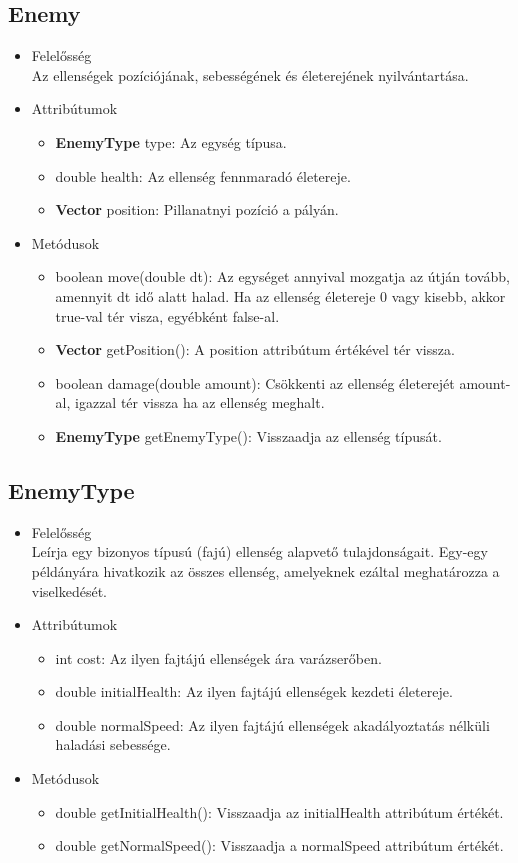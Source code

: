 \subsection{Enemy}
\begin{itemize}
\item Felelősség\\
Az ellenségek pozíciójának, sebességének és életerejének nyilvántartása.
\item Attribútumok
	\begin{itemize}
		\item \textbf{EnemyType} type: Az egység típusa.
		\item double health: Az ellenség fennmaradó életereje.
		\item \textbf{Vector} position: Pillanatnyi pozíció a pályán.
	\end{itemize}
\item Metódusok
	\begin{itemize}
		\item boolean move(double dt): Az egységet annyival mozgatja az útján tovább, amennyit dt idő alatt halad. Ha az ellenség életereje 0 vagy kisebb, akkor true-val tér visza, egyébként false-al.
		\item \textbf{Vector} getPosition(): A position attribútum értékével tér vissza.
		\item boolean damage(double amount): Csökkenti az ellenség életerejét amount-al, igazzal tér vissza ha az ellenség meghalt.
		\item \textbf{EnemyType} getEnemyType(): Visszaadja az ellenség típusát.
	\end{itemize}
\end{itemize}


\subsection{EnemyType}
\begin{itemize}
\item Felelősség\\
Leírja egy bizonyos típusú (fajú) ellenség alapvető tulajdonságait. Egy-egy példányára hivatkozik az összes ellenség, amelyeknek ezáltal meghatározza a viselkedését.
\item Attribútumok
	\begin{itemize}
		\item int cost: Az ilyen fajtájú ellenségek ára varázserőben.
		\item double initialHealth: Az ilyen fajtájú ellenségek kezdeti életereje.
		\item double normalSpeed: Az ilyen fajtájú ellenségek akadályoztatás nélküli haladási sebessége.
	\end{itemize}
\item Metódusok
	\begin{itemize}
		\item double getInitialHealth(): Visszaadja az initialHealth attribútum értékét.
		\item double getNormalSpeed(): Visszaadja a normalSpeed attribútum értékét.
	\end{itemize}
\end{itemize}





